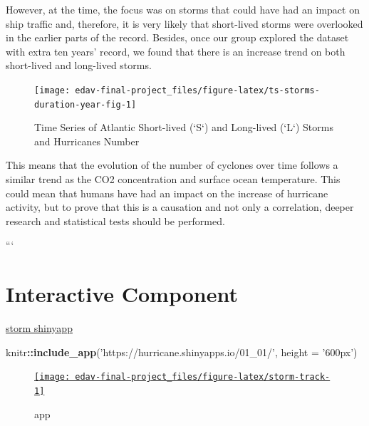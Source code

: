 \documentclass[]{book}
\newenvironment{Shaded}{\begin{snugshade}}{\end{snugshade}}
\newcommand{\DataTypeTok}[1]{\textcolor[rgb]{0.13,0.29,0.53}{#1}}
\newcommand{\KeywordTok}[1]{\textcolor[rgb]{0.13,0.29,0.53}{\textbf{#1}}}
\newcommand{\NormalTok}[1]{#1}
\newcommand{\OperatorTok}[1]{\textcolor[rgb]{0.81,0.36,0.00}{\textbf{#1}}}
\newcommand{\StringTok}[1]{\textcolor[rgb]{0.31,0.60,0.02}{#1}}
\begin{document}
However, at the time, the focus was on storms that could have had an impact on ship traffic and, therefore, it is very likely that short-lived storms were overlooked in the earlier parts of the record. Besides, once our group explored the dataset with extra ten years' record, we found that there is an increase trend on both short-lived and long-lived storms.

\begin{figure}

{\centering \texttt{[image: edav-final-project\_files/figure-latex/ts-storms-duration-year-fig-1]} 

}

\caption{Time Series of Atlantic Short-lived (`S`) and Long-lived (`L`) Storms and Hurricanes Number}\label{fig:ts-storms-duration-year-fig}
\end{figure}

This means that the evolution of the number of cyclones over time follows a similar trend as the CO2 concentration and surface ocean temperature. This could mean that humans have had an impact on the increase of hurricane activity, but to prove that this is a causation and not only a correlation, deeper research and statistical tests should be performed.

```

\hypertarget{intercom}{%
\chapter{Interactive Component}\label{intercom}}

\href{https://hurricane.shinyapps.io/01_01/}{storm shinyapp}

\begin{Shaded}
\begin{Highlighting}[]
\NormalTok{knitr}\OperatorTok{::}\KeywordTok{include_app}\NormalTok{(}\StringTok{'https://hurricane.shinyapps.io/01_01/'}\NormalTok{, }\DataTypeTok{height =} \StringTok{'600px'}\NormalTok{)}
\end{Highlighting}
\end{Shaded}

\begin{figure}

{\centering \href{https://hurricane.shinyapps.io/01_01/}{\texttt{[image: edav-final-project\_files/figure-latex/storm-track-1]} }

}

\caption{app}\label{fig:storm-track}
\end{figure}
\end{document}
